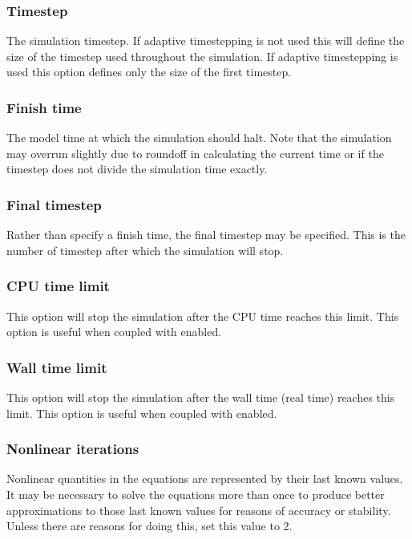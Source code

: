 \subsubsection{Timestep}
The simulation timestep. If adaptive timestepping is not used this will
define the size of the timestep used throughout the simulation.  If adaptive
timestepping is used this option defines only the size of the first
timestep.

\subsubsection{Finish time}
The model time at which the simulation should halt. Note that the simulation
may overrun slightly due to roundoff in calculating the current time or if
the timestep does not divide the simulation time exactly.

\subsubsection{Final timestep}

Rather than specify a finish time, the final timestep may be specified. This is the number of timestep after which the simulation will stop.

\subsubsection{CPU time limit}

This option will stop the simulation after the CPU time reaches this limit.
This option is useful when coupled with
 enabled.

\subsubsection{Wall time limit}

This option will stop the simulation after the wall time (real time) reaches
this limit. This option is useful when coupled with
 enabled.

\subsubsection{Nonlinear iterations}
Nonlinear quantities in the equations are represented by their last known
values. It may be necessary to solve the equations more than once to produce
better approximations to those last known values for reasons of accuracy or
stability. Unless there are reasons for doing this, set this value to 2.

